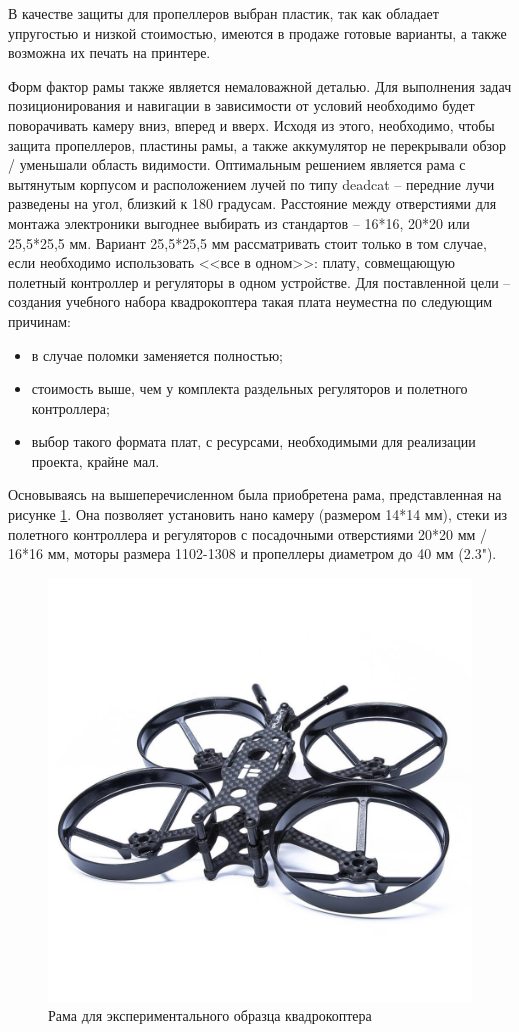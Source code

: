 В качестве защиты для пропеллеров выбран пластик, так как обладает упругостью и низкой стоимостью, имеются в продаже готовые варианты, а также возможна их печать на принтере.

Форм фактор рамы также является немаловажной деталью. Для выполнения задач позиционирования и навигации в зависимости от условий необходимо будет поворачивать камеру вниз, вперед и вверх. Исходя из этого, необходимо, чтобы защита пропеллеров, пластины рамы, а также аккумулятор не перекрывали обзор / уменьшали область видимости. Оптимальным решением является рама с вытянутым корпусом и расположением лучей по типу deadcat -- передние лучи разведены на угол, близкий к 180 градусам. Расстояние между отверстиями для монтажа электроники выгоднее выбирать из стандартов -- 16*16, 20*20 или 25,5*25,5 мм. Вариант 25,5*25,5 мм рассматривать стоит только в том случае, если необходимо использовать <<все в одном>>: плату, совмещающую полетный контроллер и регуляторы в одном устройстве. Для поставленной цели -- создания учебного набора квадрокоптера такая плата неуместна по следующим причинам:
\begin{itemize}
	\item в случае поломки заменяется полностью;
	\item стоимость выше, чем у комплекта раздельных регуляторов и полетного контроллера;
	\item выбор такого формата плат, с ресурсами, необходимыми для реализации проекта, крайне мал.
\end{itemize}

Основываясь на вышеперечисленном была приобретена рама, представленная на рисунке \ref{fig:frame}. Она позволяет установить нано камеру (размером 14*14 мм), стеки из полетного контроллера и регуляторов с посадочными отверстиями 20*20 мм / 16*16 мм, моторы размера 1102-1308 и пропеллеры диаметром до 40 мм (2.3").

\begin{figure}[H]
	\centering
	\includegraphics[width=0.5\linewidth]{../RW/pics/frame}
	\caption{Рама для экспериментального образца квадрокоптера
	}
	\label{fig:frame}
\end{figure}

